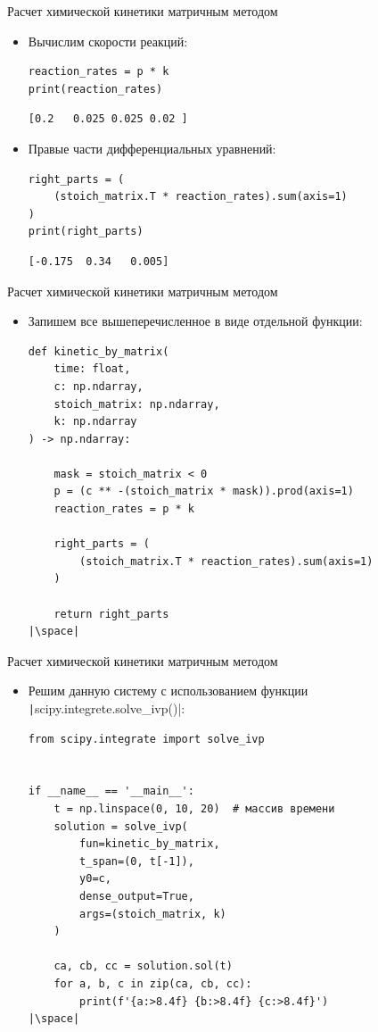 \documentclass[aspectratio=169, mathserif]{beamer}	%
\begin{document}
\begin{frame}[fragile, label=c]{Расчет химической кинетики матричным методом}
\scriptsize
\begin{itemize}
\item Вычислим скорости реакций:
\begin{verbatim}
reaction_rates = p * k
print(reaction_rates)
\end{verbatim}
\vfill
\begin{verbatim}
[0.2   0.025 0.025 0.02 ]
\end{verbatim}
\vfill
\item Правые части дифференциальных уравнений:
\vfill
\begin{verbatim}
right_parts = (
    (stoich_matrix.T * reaction_rates).sum(axis=1)
)
print(right_parts)
\end{verbatim}
\vfill
\begin{verbatim}
[-0.175  0.34   0.005]
\end{verbatim}
\end{itemize}
\vfill
\end{frame}


\begin{frame}[fragile, label=c]{Расчет химической кинетики матричным методом}
\scriptsize
\begin{itemize}
\item Запишем все вышеперечисленное в виде отдельной функции:
\vfill
\begin{verbatim}
def kinetic_by_matrix(
    time: float,
    c: np.ndarray,
    stoich_matrix: np.ndarray,
    k: np.ndarray
) -> np.ndarray:

    mask = stoich_matrix < 0
    p = (c ** -(stoich_matrix * mask)).prod(axis=1)
    reaction_rates = p * k

    right_parts = (
        (stoich_matrix.T * reaction_rates).sum(axis=1)
    )

    return right_parts
|\space|
\end{verbatim}
\end{itemize}
\vfill
\end{frame}


\begin{frame}[fragile, label=c]{Расчет химической кинетики матричным методом}
\scriptsize
\begin{itemize}
\item Решим данную систему с использованием функции \texttt|scipy.integrete.solve_ivp()|:
\vfill
\begin{verbatim}
from scipy.integrate import solve_ivp


if __name__ == '__main__':
    t = np.linspace(0, 10, 20)  # массив времени
    solution = solve_ivp(
        fun=kinetic_by_matrix,
        t_span=(0, t[-1]),
        y0=c,
        dense_output=True,
        args=(stoich_matrix, k)
    )

    ca, cb, cc = solution.sol(t)
    for a, b, c in zip(ca, cb, cc):
        print(f'{a:>8.4f} {b:>8.4f} {c:>8.4f}')
|\space|
\end{verbatim}
\end{itemize}
\vfill
\end{frame}
\end{document}
